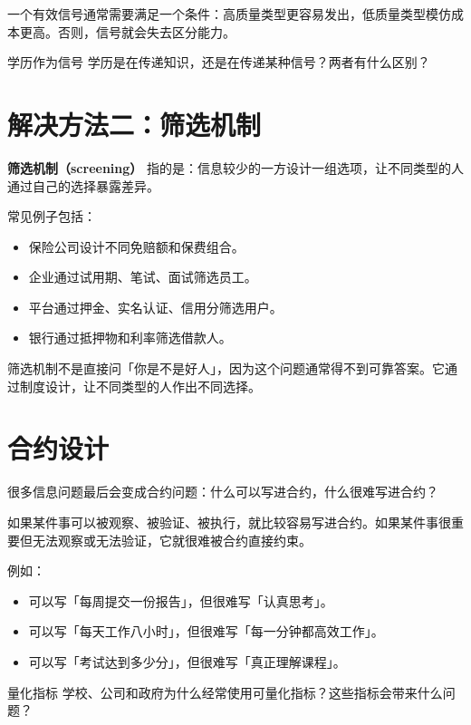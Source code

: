 \documentclass[10pt,a4paper]{ctexart}
\begin{document}
一个有效信号通常需要满足一个条件：高质量类型更容易发出，低质量类型模仿成本更高。否则，信号就会失去区分能力。

\begin{discussionbox}{学历作为信号}
学历是在传递知识，还是在传递某种信号？两者有什么区别？
\end{discussionbox}

\section{解决方法二：筛选机制}

\textbf{筛选机制（screening）} 指的是：信息较少的一方设计一组选项，让不同类型的人通过自己的选择暴露差异。

常见例子包括：
\begin{itemize}
  \item 保险公司设计不同免赔额和保费组合。
  \item 企业通过试用期、笔试、面试筛选员工。
  \item 平台通过押金、实名认证、信用分筛选用户。
  \item 银行通过抵押物和利率筛选借款人。
\end{itemize}

筛选机制不是直接问「你是不是好人」，因为这个问题通常得不到可靠答案。它通过制度设计，让不同类型的人作出不同选择。

\section{合约设计}

很多信息问题最后会变成合约问题：什么可以写进合约，什么很难写进合约？

如果某件事可以被观察、被验证、被执行，就比较容易写进合约。如果某件事很重要但无法观察或无法验证，它就很难被合约直接约束。

例如：
\begin{itemize}
  \item 可以写「每周提交一份报告」，但很难写「认真思考」。
  \item 可以写「每天工作八小时」，但很难写「每一分钟都高效工作」。
  \item 可以写「考试达到多少分」，但很难写「真正理解课程」。
\end{itemize}

\begin{discussionbox}{量化指标}
学校、公司和政府为什么经常使用可量化指标？这些指标会带来什么问题？
\end{discussionbox}
\end{document}
